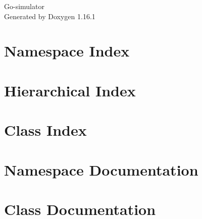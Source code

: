 \documentclass[twoside]{book}
\newcommand{\+}{\discretionary{\mbox{\scriptsize$\hookleftarrow$}}{}{}}
\newcommand{\clearemptydoublepage}{%
    \newpage{\pagestyle{empty}\cleardoublepage}%
  }
\begin{document}
  \raggedbottom
    \hypersetup{pageanchor=false,
                bookmarksnumbered=true,
                pdfencoding=unicode
               }
  \begin{titlepage}
  \vspace*{7cm}
  \begin{center}%
  {\Large Go-\/simulator}\\
  \vspace*{1cm}
  {\large Generated by Doxygen 1.16.1}\\
  \end{center}
  \end{titlepage}
  \clearemptydoublepage
  \tableofcontents
  \clearemptydoublepage
  \hypersetup{pageanchor=true}
\chapter{Namespace Index}

\chapter{Hierarchical Index}

\chapter{Class Index}

\chapter{Namespace Documentation}

\chapter{Class Documentation}


  \backmatter
  \newpage
  \clearemptydoublepage
  \printindex
\end{document}
